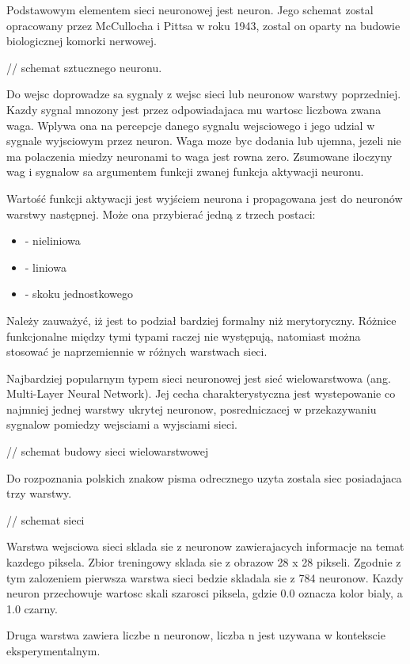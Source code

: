 \documentclass[brudnopis]{xmgr}
\begin{document}
Podstawowym elementem sieci neuronowej jest neuron. Jego schemat zostal opracowany przez McCullocha i Pittsa w roku 1943, zostal on oparty na budowie biologicznej komorki nerwowej.

// schemat sztucznego neuronu.

Do wejsc doprowadze sa sygnaly z wejsc sieci lub neuronow warstwy poprzedniej. Kazdy sygnal mnozony jest przez odpowiadajaca mu wartosc liczbowa zwana waga. Wplywa ona na percepcje danego sygnalu wejsciowego i jego udzial w sygnale wyjsciowym przez neuron. Waga moze byc dodania lub ujemna, jezeli nie ma polaczenia miedzy neuronami to waga jest rowna zero. Zsumowane iloczyny wag i sygnalow sa argumentem funkcji zwanej funkcja aktywacji neuronu.

Wartość funkcji aktywacji jest wyjściem neurona i propagowana jest do neuronów warstwy następnej. Może ona przybierać jedną z trzech postaci:
\begin{itemize}
\item
- nieliniowa
\item
- liniowa
\item
- skoku jednostkowego
\end{itemize}

Należy zauważyć, iż jest to podział bardziej formalny niż merytoryczny. Różnice funkcjonalne między tymi typami raczej nie występują, natomiast można stosować je naprzemiennie w różnych warstwach sieci.

Najbardziej popularnym typem sieci neuronowej jest sieć wielowarstwowa (ang. Multi-Layer Neural Network). Jej cecha charakterystyczna jest wystepowanie co najmniej jednej warstwy ukrytej neuronow, posredniczacej w przekazywaniu sygnalow pomiedzy wejsciami a wyjsciami sieci.

// schemat budowy sieci wielowarstwowej

Do rozpoznania polskich znakow pisma odrecznego uzyta zostala siec posiadajaca trzy warstwy.

// schemat sieci

Warstwa wejsciowa sieci sklada sie z neuronow zawierajacych informacje na temat kazdego piksela. Zbior treningowy sklada sie z obrazow 28 x 28 pikseli. Zgodnie z tym zalozeniem pierwsza warstwa sieci bedzie skladala sie z 784 neuronow. Kazdy neuron przechowuje wartosc skali szarosci piksela, gdzie 0.0 oznacza kolor bialy, a 1.0 czarny.

Druga warstwa zawiera liczbe n neuronow, liczba n jest uzywana w kontekscie eksperymentalnym.
\end{document}
